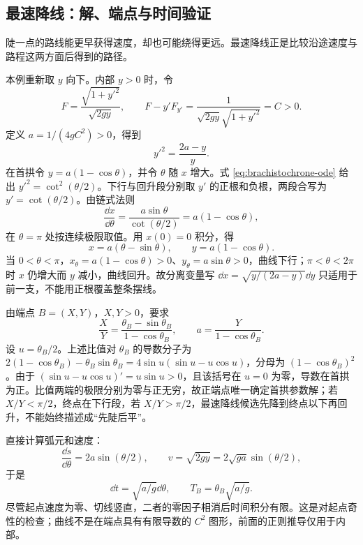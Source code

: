 \subsection{最速降线：解、端点与时间验证}
陡一点的路线能更早获得速度，却也可能绕得更远。最速降线正是比较沿途速度与路程这两方面后得到的路径。

本例重新取 $y$ 向下。内部 $y>0$ 时，令
\[
F=\frac{\sqrt{1+y'^2}}{\sqrt{2gy}},
\qquad F-y'F_{y'}=\frac1{\sqrt{2gy}\sqrt{1+y'^2}}=C>0.
\]
定义 $a=1/(4gC^2)>0$，得到
\begin{equation}\label{eq:brachistochrone-ode}
y'^2=\frac{2a-y}{y}.
\end{equation}
在首拱令 $y=a(1-\cos\theta)$，并令 $\theta$ 随 $x$ 增大。式 \eqref{eq:brachistochrone-ode} 给出 $y'^2=\cot^2(\theta/2)$。下行与回升段分别取 $y'$ 的正根和负根，两段合写为 $y'=\cot(\theta/2)$。由链式法则
\[
\frac{\dd x}{\dd\theta}
=\frac{a\sin\theta}{\cot(\theta/2)}
=a(1-\cos\theta),
\]
在 $\theta=\pi$ 处按连续极限取值。用 $x(0)=0$ 积分，得
\begin{equation}\label{eq:cycloid}
\boxed{x=a(\theta-\sin\theta),\qquad y=a(1-\cos\theta).}
\end{equation}
当 $0<\theta<\pi$，$x_\theta=a(1-\cos\theta)>0$、$y_\theta=a\sin\theta>0$，曲线下行；$\pi<\theta<2\pi$ 时 $x$ 仍增大而 $y$ 减小，曲线回升。故分离变量写 $\dd x=\sqrt{y/(2a-y)}\dd y$ 只适用于前一支，不能用正根覆盖整条摆线。

由端点 $B=(X,Y)$，$X,Y>0$，要求
\[
\frac XY=\frac{\theta_B-\sin\theta_B}{1-\cos\theta_B},\qquad
 a=\frac Y{1-\cos\theta_B}.
\]
设 $u=\theta_B/2$。上述比值对 $\theta_B$ 的导数分子为 $2(1-\cos\theta_B)-\theta_B\sin\theta_B=4\sin u(\sin u-u\cos u)$，分母为 $(1-\cos\theta_B)^2$。由于 $(\sin u-u\cos u)'=u\sin u>0$，且该括号在 $u=0$ 为零，导数在首拱为正。比值两端的极限分别为零与正无穷，故正端点唯一确定首拱参数解；若 $X/Y<\pi/2$，终点在下行段，若 $X/Y>\pi/2$，最速降线候选先降到终点以下再回升，不能始终描述成“先陡后平”。

直接计算弧元和速度：
\[
\frac{\dd s}{\dd\theta}=2a\sin(\theta/2),\qquad
v=\sqrt{2gy}=2\sqrt{ga}\sin(\theta/2),
\]
于是
\begin{equation}\label{eq:var-brach-time}
\dd t=\sqrt{a/g}\dd\theta,\qquad T_B=\theta_B\sqrt{a/g}.
\end{equation}
尽管起点速度为零、切线竖直，二者的零因子相消后时间积分有限。这是对起点奇性的检查；曲线不是在端点具有有限导数的 $C^2$ 图形，前面的正则推导仅用于内部。

